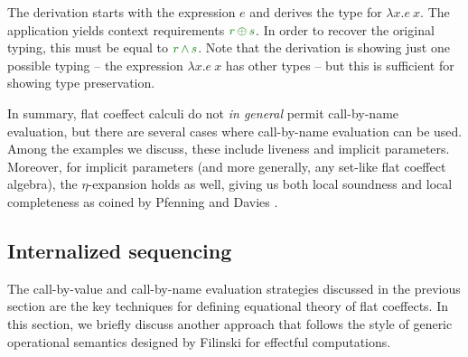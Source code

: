 \noindent
The derivation starts with the expression $e$ and derives the type for $\lambda x.e~x$. The
application yields context requirements $\cclrd{r}\,\cpar\,\cclrd{s}$. In order to recover the
original typing, this must be equal to $\cclrd{r}\,\czip\,\cclrd{s}$. Note that the derivation
is showing just one possible typing -- the expression $\lambda x.e~x$ has other types -- but
this is sufficient for showing type preservation.

In summary, flat coeffect calculi do not \emph{in general} permit call-by-name evaluation, but
there are several cases where call-by-name evaluation can be used. Among the examples we discuss,
these include liveness and implicit parameters. Moreover, for implicit parameters (and more
generally, any set-like flat coeffect algebra), the $\eta$-expansion holds as well, giving us
both local soundness and local completeness as coined by Pfenning and Davies \cite{logic-modal-reconstruction}.


\subsection{Internalized sequencing}
\label{sec:flat-syntax-norm}

The call-by-value and call-by-name evaluation strategies discussed in the previous section are
the key techniques for defining equational theory of flat coeffects. In this section, we briefly 
discuss another approach that follows the style of generic operational semantics designed by Filinski
\cite{monads-inaction} for effectful computations.


